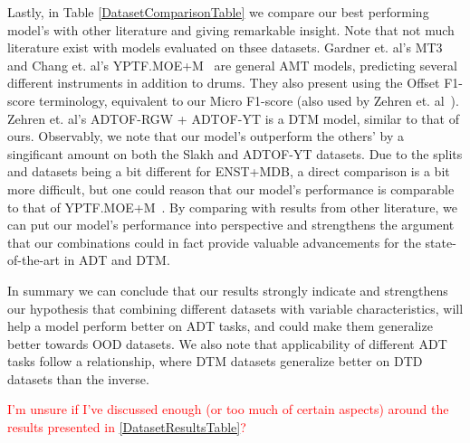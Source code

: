 Lastly, in Table \ref{DatasetComparisonTable} we compare our best performing model's with other literature and giving remarkable insight. Note that not much literature exist with models evaluated on thsee datasets. Gardner et. al's MT3~\cite{gardner2022mt3multitaskmultitrackmusic} and Chang et. al's YPTF.MOE+M~\cite{chang2024yourmt3+} are general \gls{AMT} models, predicting several different instruments in addition to drums. They also present using the Offset F1-score terminology, equivalent to our Micro F1-score (also used by Zehren et. al~\cite{signals4040042}). Zehren et. al's ADTOF-RGW + ADTOF-YT is a \gls{DTM} model, similar to that of ours. Observably, we note that our model's outperform the others' by a singificant amount on both the Slakh and ADTOF-YT datasets. Due to the splits and datasets being a bit different for ENST+MDB, a direct comparison is a bit more difficult, but one could reason that our model's performance is comparable to that of YPTF.MOE+M~\cite{chang2024yourmt3+}. By comparing with results from other literature, we can put our model's performance into perspective and strengthens the argument that our combinations could in fact provide valuable advancements for the state-of-the-art in \gls{ADT} and \gls{DTM}.

In summary we can conclude that our results strongly indicate and strengthens our hypothesis that combining different datasets with variable characteristics, will help a model perform better on \gls{ADT} tasks, and could make them generalize better towards \acrfull{OOD} datasets. We also note that applicability of different \gls{ADT} tasks follow a relationship, where \gls{DTM} datasets generalize better on \gls{DTD} datasets than the inverse.

\textcolor{red}{I'm unsure if I've discussed enough (or too much of certain aspects) around the results presented in \ref{DatasetResultsTable}?}